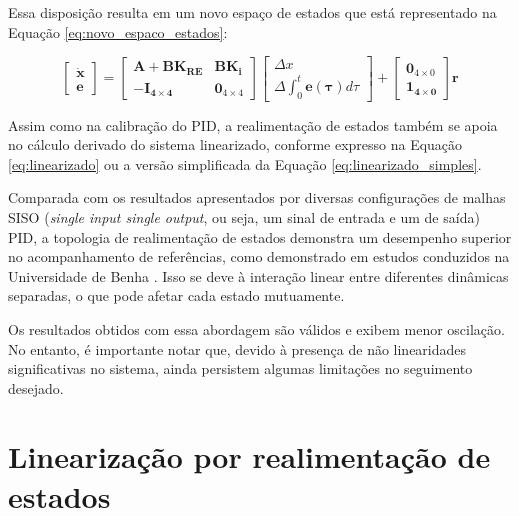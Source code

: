 \documentclass[main.tex]{subfiles}
\begin{document}
Essa disposição resulta em um novo espaço de estados que está representado na Equação \ref{eq:novo_espaco_estados}:

\begin{equation}\label{eq:novo_espaco_estados}
    \begin{bmatrix}
        \boldsymbol{\dot{x}}\\
        \boldsymbol{e}
    \end{bmatrix} = 
    \begin{bmatrix}
        \boldsymbol{A} + \boldsymbol{BK_{RE}} & \boldsymbol{BK_i}\\
        - \boldsymbol{I_{4\times4}} & \boldsymbol{0}_{4\times4}
    \end{bmatrix}\begin{bmatrix}
        \Delta x\\
        \Delta \int_0^t\boldsymbol{e(\tau)}d\tau
    \end{bmatrix} + \begin{bmatrix}
        \boldsymbol{0}_{4\times0}\\\boldsymbol{1_{4\times0}}
    \end{bmatrix}\boldsymbol{r}
\end{equation}

Assim como na calibração do PID, a realimentação de estados também se apoia no cálculo derivado do sistema linearizado, conforme expresso na Equação \ref{eq:linearizado} ou a versão simplificada da Equação \ref{eq:linearizado_simples}. 

Comparada com os resultados apresentados por diversas configurações de malhas SISO (\textit{single input single output}, ou seja, um sinal de entrada e um de saída) PID, a topologia de realimentação de estados demonstra um desempenho superior no acompanhamento de referências, como demonstrado em estudos conduzidos na Universidade de Benha \cite{controle:state-feedback}. Isso se deve à interação linear entre diferentes dinâmicas separadas, o que pode afetar cada estado mutuamente.

Os resultados obtidos com essa abordagem são válidos e exibem menor oscilação. No entanto, é importante notar que, devido à presença de não linearidades significativas no sistema, ainda persistem algumas limitações no seguimento desejado.

\section{Linearização por realimentação de estados}
\end{document}
